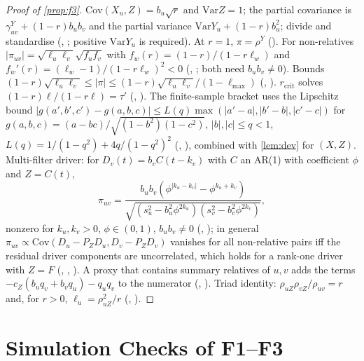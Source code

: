 \begin{proof}[Proof of \cref{prop:f3}]
$\mathrm{Cov}(X_u,Z)=b_u\sqrt r$ and $\mathrm{Var}Z=1$; the partial covariance
is $\gamma^Y_{uv}+(1-r)b_ub_v$ and the partial variance
$\mathrm{Var}Y_u+(1-r)b_u^2$; divide and standardise (,
; positive $\mathrm{Var}Y_u$ is required). At $r=1$,
$\pi=\rho^Y$ (). For non-relatives
$|\pi_{uv}|=\sqrt{\ell_u\ell_v}\sqrt{f_uf_v}$ with $f_w(r)=(1-r)/(1-r\ell_w)$
and $f_w'(r)=(\ell_w-1)/(1-r\ell_w)^2<0$ (,
; both need $b_ub_v\ne0$). Bounds
$(1-r)\sqrt{\ell_u\ell_v}\le|\pi|\le(1-r)\sqrt{\ell_u\ell_v}/(1-\ell_{\max})$
(, ). $r_{\mathrm{crit}}$ solves
$(1-r)\ell/(1-r\ell)=\tau'$ (, ). The
finite-sample bracket uses the Lipschitz bound
$|g(a',b',c')-g(a,b,c)|\le L(q)\max(|a'-a|,|b'-b|,|c'-c|)$ for
$g(a,b,c)=(a-bc)/\sqrt{(1-b^2)(1-c^2)}$, $|b|,|c|\le q<1$,
$L(q)=1/(1-q^2)+4q/(1-q^2)^2$ (, ),
combined with \cref{lem:dev} for $(X,Z)$. Multi-filter driver: for
$D_v(t)=b_vC(t-k_v)$ with $C$ an AR(1) with coefficient $\phi$ and $Z=C(t)$,
\[
\pi_{uv}=\frac{b_ub_v(\phi^{|k_u-k_v|}-\phi^{k_u+k_v})}{\sqrt{(s_u^2-b_u^2\phi^{2k_u})(s_v^2-b_v^2\phi^{2k_v})}},
\]
nonzero for $k_u,k_v>0$, $\phi\in(0,1)$, $b_ub_v\ne0$ (,
); in general $\pi_{uv}\propto\mathrm{Cov}(D_u-P_ZD_u,D_v-P_ZD_v)$
vanishes for all non-relative pairs iff the residual driver components are
uncorrelated, which holds for a rank-one driver with $Z=F$
(, , ). A
proxy that contains summary relatives of $u,v$ adds the terms
$-c_Z(b_uq_v+b_vq_u)-q_uq_v$ to the numerator (,
). Triad identity: $\rho_{uZ}\rho_{vZ}/\rho_{uv}=r$ and, for
$r>0$, $\ell_u=\rho_{uZ}^2/r$ (, ).
\end{proof}

\section{Simulation Checks of F1--F3}
\label{app:sims}

